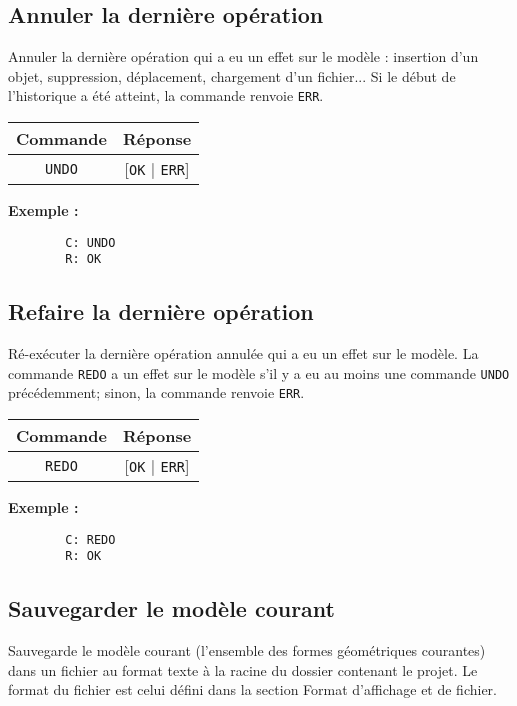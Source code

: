 \documentclass[11pt,a4paper]{article}
\begin{document}
	\subsection{Annuler la dernière opération}
	Annuler la dernière opération qui a eu un effet sur le modèle : insertion d'un objet, suppression, déplacement, chargement d'un fichier... Si le début de l'historique a été atteint, la commande renvoie \texttt{ERR}.
	
	\begin{center}
		\begin{tabular}[c]{|c | c|}
			\hline
			\textbf{Commande} & \textbf{Réponse} \\
			\hline
			\texttt{UNDO} & [\texttt{OK} | \texttt{ERR}] \\
			\hline
		\end{tabular}
	\end{center}
	
	\textbf{Exemple :}
	\begin{verbatim}
		C: UNDO
		R: OK
	\end{verbatim}
	
	\subsection{Refaire la dernière opération}
	Ré-exécuter la dernière opération annulée qui a eu un effet sur le modèle. La commande \texttt{REDO} a un effet sur le modèle s'il y a eu au moins une commande \texttt{UNDO} précédemment; sinon, la commande renvoie \texttt{ERR}.
	
	\begin{center}
		\begin{tabular}[c]{|c | c|}
			\hline
			\textbf{Commande} & \textbf{Réponse} \\
			\hline
			\texttt{REDO} & [\texttt{OK} | \texttt{ERR}] \\
			\hline
		\end{tabular}
	\end{center}
	
	\textbf{Exemple :}
	\begin{verbatim}
		C: REDO
		R: OK
	\end{verbatim}
	
	\subsection{Sauvegarder le modèle courant}
	Sauvegarde le modèle courant (l’ensemble des formes géométriques courantes) dans un fichier au format texte à la racine du dossier contenant le projet. Le format du fichier est celui défini dans la section Format d’affichage et de fichier.
	
\end{document}
